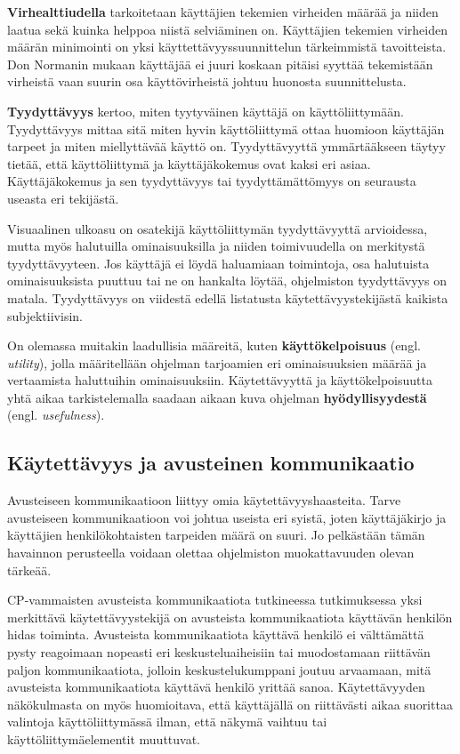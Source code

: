\documentclass[utf8]{gradu3}
\begin{document}
\textbf{Virhealttiudella} tarkoitetaan käyttäjien tekemien virheiden määrää ja niiden laatua sekä kuinka helppoa niistä selviäminen on. Käyttäjien tekemien virheiden määrän minimointi on yksi käyttettävyyssuunnittelun tärkeimmistä tavoitteista. Don Normanin \parencite[]{norman-doet} mukaan  käyttäjää ei juuri koskaan pitäisi syyttää tekemistään virheistä vaan suurin osa käyttövirheistä johtuu huonosta suunnittelusta.

\textbf{Tyydyttävyys} kertoo, miten tyytyväinen käyttäjä on käyttöliittymään. Tyydyttävyys mittaa sitä miten hyvin käyttöliittymä ottaa huomioon käyttäjän tarpeet ja miten miellyttävää käyttö on. Tyydyttävyyttä ymmärtääkseen täytyy tietää, että käyttöliittymä ja käyttäjäkokemus ovat kaksi eri asiaa. Käyttäjäkokemus ja sen tyydyttävyys tai tyydyttämättömyys on seurausta useasta eri tekijästä. 

Visuaalinen ulkoasu on osatekijä käyttöliittymän tyydyttävyyttä arvioidessa, mutta myös halutuilla ominaisuuksilla ja niiden toimivuudella on merkitystä tyydyttävyyteen. Jos käyttäjä ei löydä haluamiaan toimintoja, osa halutuista ominaisuuksista puuttuu tai ne on hankalta löytää, ohjelmiston tyydyttävyys on matala. Tyydyttävyys on viidestä edellä listatusta käytettävyystekijästä kaikista subjektiivisin.

On olemassa muitakin laadullisia määreitä, kuten \textbf{käyttökelpoisuus} (engl. \textit{utility}), jolla määritellään ohjelman tarjoamien eri ominaisuuksien määrää ja vertaamista haluttuihin ominaisuuksiin. Käytettävyyttä ja käyttökelpoisuutta yhtä aikaa tarkistelemalla saadaan aikaan kuva ohjelman \textbf{hyödyllisyydestä} (engl. \textit{usefulness}). \parencite[]{usability-101}

\subsection{Käytettävyys ja avusteinen kommunikaatio}

Avusteiseen kommunikaatioon liittyy omia käytettävyyshaasteita. Tarve avusteiseen kommunikaatioon voi johtua useista eri syistä, joten käyttäjäkirjo ja käyttäjien henkilökohtaisten tarpeiden määrä on suuri. Jo pelkästään tämän havainnon perusteella voidaan olettaa ohjelmiston muokattavuuden olevan tärkeää.

CP-vammaisten avusteista kommunikaatiota tutkineessa tutkimuksessa \parencite[]{classmate-aac-study} yksi merkittävä käytettävyystekijä on avusteista kommunikaatiota käyttävän henkilön hidas toiminta. Avusteista kommunikaatiota käyttävä henkilö ei välttämättä pysty reagoimaan nopeasti eri keskusteluaiheisiin tai muodostamaan riittävän paljon kommunikaatiota, jolloin keskustelukumppani joutuu arvaamaan, mitä avusteista kommunikaatiota käyttävä henkilö yrittää sanoa. Käytettävyyden näkökulmasta on myös huomioitava, että käyttäjällä on riittävästi aikaa suorittaa valintoja käyttöliittymässä ilman, että näkymä vaihtuu tai käyttöliittymäelementit muuttuvat.
\end{document}
